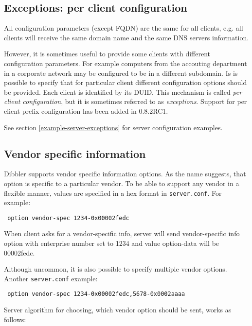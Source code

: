 \begin{enumerate}
\subsection{Exceptions: per client configuration}
\label{feature-exceptions}
All configuration parameters (except FQDN) are the same for all
clients, e.g. all clients will receive the same domain name and the
same DNS servers information.

However, it is sometimes useful to provide some clients with different
configuration parameters. For example computers from the accouting
department in a corporate network may be configured to be in a
different subdomain. Is is possible to specify that for particular
client different configuration options should be provided. Each client
is identified by its DUID. This mechanism is called \emph{per client
  configuration}, but it is sometimes referred to as
\emph{exceptions}. Support for per client prefix configuration has
been added in 0.8.2RC1.

See section \ref{example-server-exceptions} for server configuration
examples.

\subsection{Vendor specific information}
\label{feature-vendor-spec}
Dibbler supports vendor specific information options. As the name
suggests, that option is specific to a particular vendor. To be able
to support any vendor in a flexible manner, values are specified in a
hex format in \verb+server.conf+. For example:

\begin{lstlisting}
 option vendor-spec 1234-0x00002fedc
\end{lstlisting}

When client asks for a vendor-specific info, server will send
vendor-specific info option with enterprise number set to 1234 and
value option-data will be 00002fedc.

Although uncommon, it is also possible to specify multiple vendor
options. Another \verb+server.conf+ example:

\begin{lstlisting}
 option vendor-spec 1234-0x00002fedc,5678-0x0002aaaa
\end{lstlisting}

Server algorithm for choosing, which vendor option should be sent,
works as follows:


\end{enumerate}
